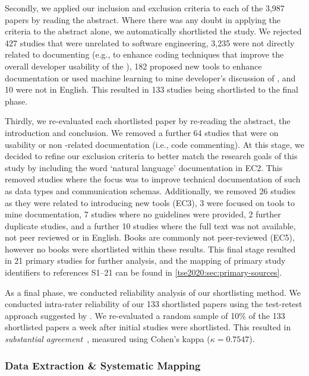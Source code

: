 Secondly, we applied our inclusion and exclusion criteria to each of the 3,987 papers by reading the abstract. Where there was any doubt in applying the criteria to the abstract alone, we automatically shortlisted the study. We rejected 427 studies that were unrelated to software engineering, 3,235 were not directly related to documenting  (e.g., to enhance coding techniques that improve the overall developer usability of the ), 182 proposed new tools to enhance  documentation or used machine learning to mine developer's discussion of , and 10 were not in English. This resulted in 133 studies being shortlisted to the final phase.

Thirdly, we re-evaluated each shortlisted paper by re-reading the abstract, the introduction and conclusion. We removed a further 64 studies that were on  usability or non -related  documentation (i.e., code commenting). At this stage, we decided to refine our exclusion criteria to better match the research goals of this study by including the word `natural language' documentation in EC2. This removed studies where the focus was to improve technical documentation of  such as data types and communication schemas. Additionally, we removed 26 studies as they were related to introducing new tools (EC3), 3 were focused on tools to mine  documentation, 7 studies where no guidelines were provided, 2 further duplicate studies, and a further 10 studies where the full text was not available, not peer reviewed or in English. Books are commonly not peer-reviewed (EC5), however no books were shortlisted within these results. This final stage resulted in 21 primary studies for further analysis, and the mapping of primary study identifiers to references S1--21 can be found in \cref{tse2020:sec:primary-sources}.

As a final phase, we conducted reliability analysis of our shortlisting method. We conducted intra-rater reliability of our 133 shortlisted papers using the test-retest approach suggested by \citet{Kitchenham:2007dd}. We re-evaluated a random sample of 10\% of the 133 shortlisted papers a week after initial studies were shortlisted. This resulted in \textit{substantial agreement}~\citep{Landis:1977kv}, measured using Cohen's kappa ($\kappa=0.7547$).


\subsubsection{Data Extraction \& Systematic Mapping}
\label{tse2020:sec:data-extraction}

